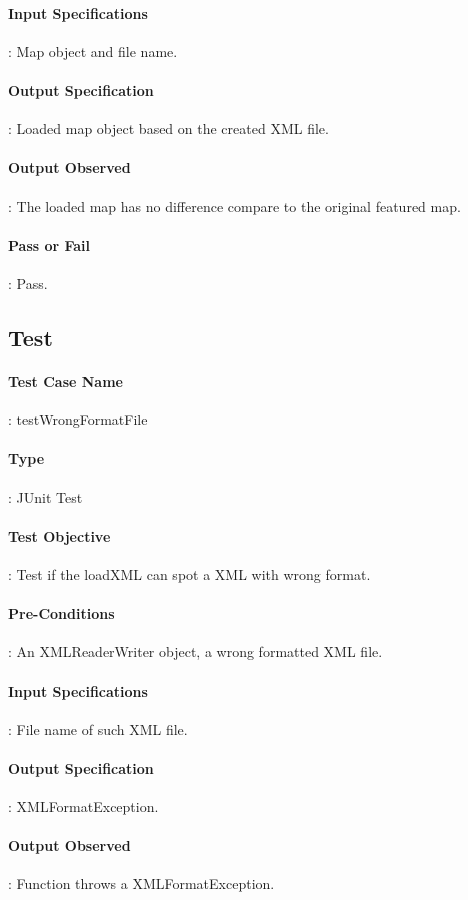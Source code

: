 \documentclass[12pt, a4paper]{report}
\begin{document}
\paragraph{Input Specifications}: Map object and file name.
\paragraph{Output Specification}: Loaded map object based on the created XML file.
\paragraph{Output Observed}: The loaded map has no difference compare to the original featured map.
\paragraph{Pass or Fail}: Pass.

\addtocounter{casecounter}{1}
\subsection{Test }
\paragraph{Test Case Name}: testWrongFormatFile
\paragraph{Type}: JUnit Test
\paragraph{Test Objective}: Test if the loadXML can spot a XML with wrong format.
\paragraph{Pre-Conditions}: An XMLReaderWriter object, a wrong formatted XML file.
\paragraph{Input Specifications}: File name of such XML file.
\paragraph{Output Specification}: XMLFormatException.
\paragraph{Output Observed}: Function throws a XMLFormatException.
\end{document}
